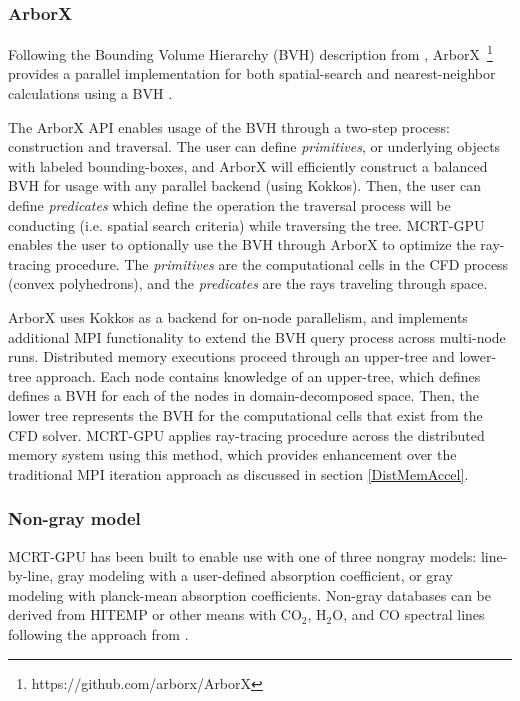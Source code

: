 \subsubsection{ArborX}
Following the Bounding Volume Hierarchy (BVH) description from \citet{Karras2012MaximizingTrees}, ArborX~\footnote{https://github.com/arborx/ArborX} provides a parallel implementation for both spatial-search and nearest-neighbor calculations using a BVH \cite{Lebrun-Grandie2019ArborX:Library}.

The ArborX API enables usage of the BVH through a two-step process: construction and traversal. The user can define \textit{primitives}, or underlying objects with labeled bounding-boxes, and ArborX will efficiently construct a balanced BVH for usage with any parallel backend (using Kokkos). Then, the user can define \textit{predicates} which define the operation the traversal process will be conducting (i.e. spatial search criteria) while traversing the tree.
MCRT-GPU enables the user to optionally use the BVH through ArborX to optimize the ray-tracing procedure. The \textit{primitives} are the computational cells in the CFD process (convex polyhedrons), and the \textit{predicates} are the rays traveling through space.

ArborX uses Kokkos as a backend for on-node parallelism, and implements additional MPI functionality to extend the BVH query process across multi-node runs. Distributed memory executions proceed through an upper-tree and lower-tree approach.
Each node contains knowledge of an upper-tree, which defines defines a BVH for each of the nodes in domain-decomposed space. Then, the lower tree represents the BVH for the computational cells that exist from the CFD solver. 
MCRT-GPU applies ray-tracing procedure across the distributed memory system using this method, which provides enhancement over the traditional MPI iteration approach as discussed in section \ref{DistMemAccel}.

\subsubsection{Non-gray model}
MCRT-GPU has been built to enable use with one of three nongray models: line-by-line, gray modeling with a user-defined absorption coefficient, or gray modeling with planck-mean absorption coefficients. Non-gray databases can be derived from HITEMP or other means with CO$_2$, H$_2$O, and CO spectral lines \cite{Rothman2010HITEMPDatabase} following the approach from .


